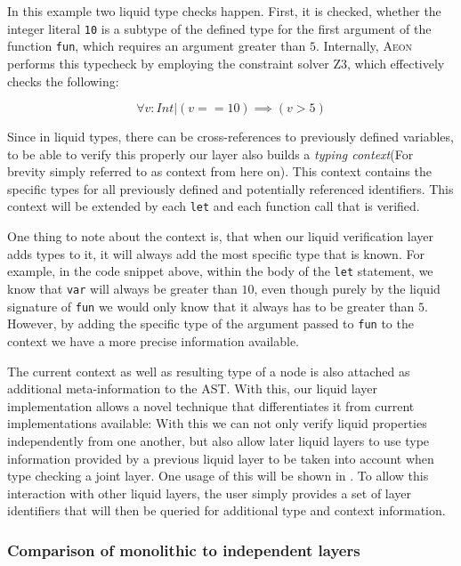 In this example two liquid type checks happen. First, it is checked, whether the integer literal \texttt{10} is a subtype of the defined type for the first argument of the function \texttt{fun}, which requires an argument greater than $5$. Internally, \textsc{Aeon} performs this typecheck by employing the constraint solver \textsc{Z3}, which effectively checks the following:

$$\forall v:Int | (v==10)\implies(v>5)$$

Since in liquid types, there can be cross-references to previously defined variables, to be able to verify this properly our layer also builds a \textit{typing context}(For brevity simply referred to as context from here on). This context contains the specific types for all previously defined and potentially referenced identifiers. This context will be extended by each \texttt{let} and each function call that is verified.

One thing to note about the context is, that when our liquid verification layer adds types to it, it will always add the most specific type that is known. For example, in the code snippet above, within the body of the \texttt{let} statement, we know that \texttt{var} will always be greater than $10$, even though purely by the liquid signature of \texttt{fun} we would only know that it always has to be greater than $5$. However, by adding the specific type of the argument passed to \texttt{fun} to the context we have a more precise information available.

The current context as well as resulting type of a node is also attached as additional meta-information to the AST. With this, our liquid layer implementation allows a novel technique that differentiates it from current implementations available: With this we can not only verify liquid properties independently from one another, but also allow later liquid layers to use type information provided by a previous liquid layer to be taken into account when type checking a joint layer. One usage of this will be shown in . To allow this interaction with other liquid layers, the user simply provides a set of layer identifiers that will then be queried for additional type and context information.

\subsubsection{Comparison of monolithic to independent layers}
\label{sssec:uc2_comparison}


